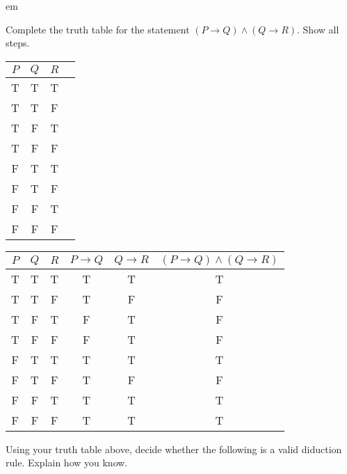 \documentclass[12pt]{exam}
\def\imp{\rightarrow}
\begin{document}
  \underline{\hspace{2.5 in}}
  em

 \begin{questions}
   \question[8] Complete the truth table for the statement $(P \imp Q) \wedge (Q \imp R)$.  Show all steps.

   \begin{center}{\renewcommand{\arraystretch}{2.5}
     \begin{tabular}{c|c|c||c}
       $P$&$Q$& $R$ & \hspace{5 in} \\ \hline
     T & T & T & \\
     T & T & F & \\
     T & F & T & \\
     T & F & F & \\
     F & T & T & \\
     F & T & F & \\
     F & F & T & \\
     F & F & F & \\
     \end{tabular}
     }
     \end{center}

       \begin{solution}
         \begin{center}
       \begin{tabular}{c|c|c||c | c|c}
         $P$ & $Q$ & $R$ & $P \imp Q$ & $Q \imp R$ & $(P \imp Q) \wedge (Q \imp R)$\\ \hline
         T & T & T & T & T & T\\
         T & T & F & T & F & F\\
         T & F & T & F & T & F \\
         T & F & F & F & T & F \\
         F & T & T & T & T & T \\
         F & T & F & T & F & F \\
         F & F & T & T & T & T \\
         F & F & F & T & T & T
       \end{tabular}
     \end{center}
     \end{solution}


   \question[2] Using your truth table above, decide whether the following is a valid diduction rule.  Explain how you know.


\end{questions}
\end{document}
